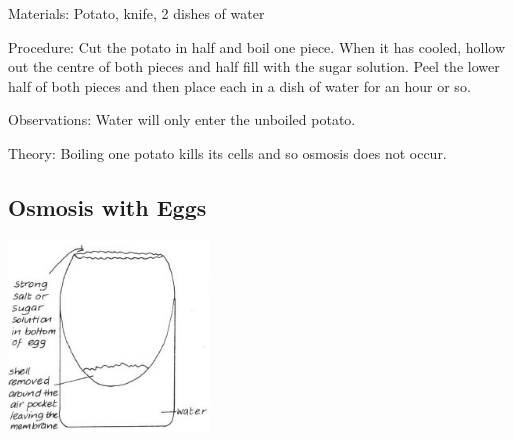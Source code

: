 \begin{multicols}{2}
\begin{description*}
\item[Materials:]{Potato, knife, 2 dishes of water}
\item[Procedure:]{Cut the potato in half
and boil one piece. When it has
cooled, hollow out the centre of
both pieces and half fill
with the sugar solution.
Peel the lower half of both
pieces and then place each in a dish of water for an hour or so.}
\item[Observations:]{Water will only enter the unboiled potato.}
\item[Theory:]{Boiling one potato kills its cells and so osmosis does not occur.}
\end{description*}

\subsection{Osmosis with Eggs} %

\begin{center}
\includegraphics[width=0.4\textwidth]{./img/vso/osmosis-eggs.jpg}
\end{center}


\end{multicols}
